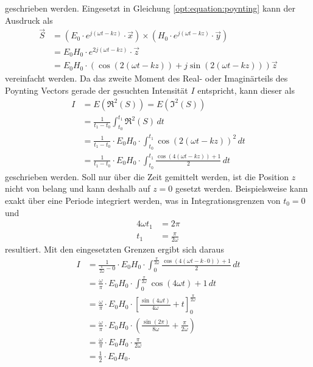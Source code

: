 geschrieben werden.
Eingesetzt in Gleichung \eqref{opt:equation:poynting} kann der Ausdruck als
\begin{align*}
\vec{S}
&=
\left(E_0 \cdot e^{j(\omega t-k z)} \cdot \vec{x}\right) \times \left(H_0 \cdot e^{j(\omega t-k z)} \cdot \vec{y}\right)
\\
&=
E_0 H_0 \cdot e^{2j(\omega t-k z)} \cdot \vec{z}
\\
&=
E_0 H_0 \cdot \left(\cos{(2(\omega t-kz))}+j\sin{(2(\omega t-kz))}\right) \vec{z}
\end{align*}
vereinfacht werden.
Da das zweite Moment des Real- oder Imaginärteils des Poynting Vectors gerade der gesuchten Intensität $I$ entspricht, kann dieser als 
\begin{align*}
I
&=
E(\Re^2(S))
=
E(\Im^2(S))
\\
&=
\frac{1}{t_1- t_0} \int_{t_0}^{t_1} \Re^2(S) \,dt
\\
&=
\frac{1}{t_1 - t_0} \cdot E_0 H_0 \cdot \int_{t_0}^{t_1}\cos\left({2(\omega t-kz)}\right)^2 \,dt
\\
&=
\frac{1}{t_1 - t_0} \cdot E_0 H_0 \cdot \int_{t_0}^{t_1}\frac{\cos(4(\omega t-kz)) + 1}{2} \,dt
\end{align*}
geschrieben werden.
Soll nur über die Zeit gemittelt werden, ist die Position $z$ nicht von belang und kann deshalb auf $z=0$ gesetzt werden.
Beispielsweise kann exakt über eine Periode integriert werden, was in Integrationsgrenzen von $t_0=0$ und
\begin{align*}
4\omega t_1
&=
2\pi
\\
t_1
&=
\frac{\pi}{2\omega}
\end{align*}
resultiert.
Mit den eingesetzten Grenzen ergibt sich daraus
\begin{align*}
I
&=
\frac{1}{\frac{\pi}{2\omega} - 0} \cdot E_0 H_0 \cdot \int_{0}^{\frac{\pi}{2\omega}}\frac{\cos(4(\omega t-k\cdot0)) + 1}{2} \,dt
\\
&=
\frac{\omega}{\pi} \cdot E_0 H_0 \cdot \int_{0}^{\frac{\pi}{2\omega}}\cos(4\omega t) + 1 \,dt
\\
&=
\frac{\omega}{\pi} \cdot E_0 H_0 \cdot \left[\frac{\sin(4\omega t)}{4\omega} + t \right]_{0}^{\frac{\pi}{2\omega}}
\\
&=
\frac{\omega}{\pi} \cdot E_0 H_0 \cdot \left(\frac{\sin(2\pi)}{8\omega} + \frac{\pi}{2\omega}\right)
\\
&=
\frac{\omega}{\pi} \cdot E_0 H_0 \cdot \frac{\pi}{2\omega}
\\
&=
\frac{1}{2} \cdot E_0 H_0
.
\end{align*}
